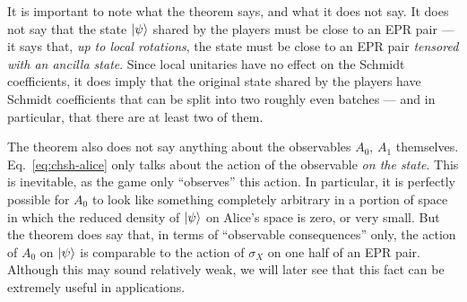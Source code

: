 It is important to note what the theorem says, and what it does not say. It does not say that the state $|\psi\rangle$ shared by the players must be close to an EPR pair --- it says that, \emph{up to local rotations}, the state must be close to an EPR pair \emph{tensored with an ancilla state}. Since local unitaries have no effect on the Schmidt coefficients, it does imply that the original state shared by the players have Schmidt coefficients that can be split into two roughly even batches --- and in particular, that there are at least two of them. 

 The theorem also does not say anything about the observables $A_0$, $A_1$ themselves. Eq.~\eqref{eq:chsh-alice} only talks about the action of the observable \emph{on the state}. This is inevitable, as the game only ``observes'' this action. In particular, it is perfectly possible for $A_0$ to look like something completely arbitrary in a portion of space in which the reduced density of $|\psi\rangle$ on Alice's space is zero, or very small. But the theorem does say that, in terms of ``observable consequences'' only, the action of $A_0$ on $|\psi\rangle$ is comparable to the action of $\sigma_X$ on one half of an EPR pair. Although this may sound relatively weak, we will later see that this fact can be extremely useful in applications. 


